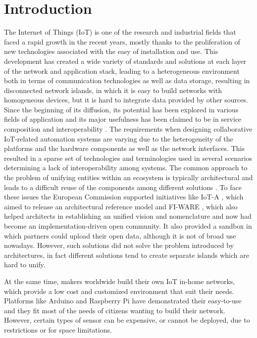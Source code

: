 \section{Introduction}
The Internet of Things (IoT) is one of the research and industrial fields that faced a rapid growth in the recent years, mostly thanks to the proliferation of new technologies associated with the easy of installation and use. This development has created a wide variety of standards and solutions at each layer of the network and application stack, leading to a heterogeneous environment both in terms of communication technologies as well as data storage, resulting in disconnected network islands, in which it is easy to build networks with homogeneous devices, but it is hard to integrate data provided by other sources. Since the beginning of its diffusion, its potential has been explored in various fields of application and its major usefulness has been claimed to be in service composition and interoperability \cite{atzori2010internet}. The requirements when designing collaborative IoT-related automation systems are varying due to the heterogeneity of the platforms and the hardware components as well as the network interfaces.
This resulted in a sparse set of technologies and terminologies used in several scenarios determining a lack of interoperability among systems.
The common approach to the problem of unifying entities within an ecosystem is typically architectural and leads to a difficult reuse of the components among different solutions \cite{krco2014designing}.
To face these issues the European Commission supported initiatives like IoT-A \cite{iot-a}, which aimed to release an architectural reference model and FI-WARE \cite{fiware}, which also helped architects in establishing an unified vision and nomenclature and now had become an implementation-driven open community.
It also provided a sandbox in which partners could upload their open data, although it is not of broad use nowadays.
However, such solutions did not solve the problem introduced by architectures, in fact different solutions tend to create separate islands which are hard to unify.

At the same time, makers worldwide build their own IoT in-home networks, which provide a low cost and customized environment that suit their needs. Platforms like Arduino and Raspberry Pi have demonstrated their easy-to-use and they fit most of the needs of citizens wanting to build their network. However, certain types of sensor can be expensive, or cannot be deployed, due to restrictions or for space limitations. 

